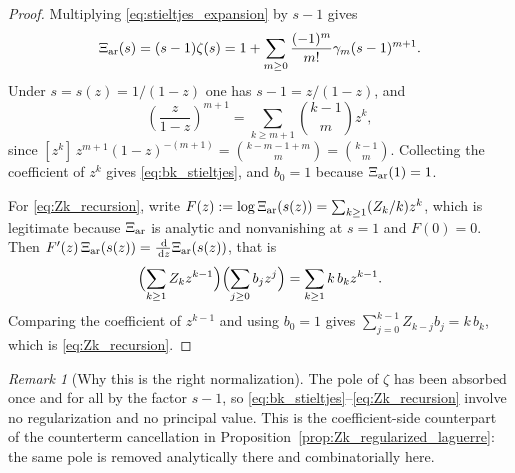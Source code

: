 \documentclass[11pt]{amsart}
\numberwithin{equation}{section}
\theoremstyle{plain}
\theoremstyle{definition}
\theoremstyle{remark}
\newtheorem{remark}[theorem]{Remark}
\newcommand{\dd}{\,\mathrm d}
\begin{document}
\begin{proof}
Multiplying \eqref{eq:stieltjes_expansion} by $s-1$ gives
\begin{equation}
 \Xi_{\rm ar}(s)=(s-1)\zeta(s)
 =1+\sum_{m\ge0}\frac{(-1)^m}{m!}\gamma_m(s-1)^{m+1}.
\end{equation}
Under $s=s(z)=1/(1-z)$ one has $s-1=z/(1-z)$, and
\begin{equation}
 \left(\frac{z}{1-z}\right)^{m+1}
 =\sum_{k\ge m+1}\binom{k-1}{m}z^k ,
\end{equation}
since $[z^k]\,z^{m+1}(1-z)^{-(m+1)}=\binom{k-m-1+m}{m}=\binom{k-1}{m}$.  Collecting the
coefficient of $z^k$ gives \eqref{eq:bk_stieltjes}, and $b_0=1$ because
$\Xi_{\rm ar}(1)=1$.

For \eqref{eq:Zk_recursion}, write $F(z):=\log\Xi_{\rm ar}(s(z))=\sum_{k\ge1}(Z_k/k)z^k$,
which is legitimate because $\Xi_{\rm ar}$ is analytic and nonvanishing at $s=1$ and
$F(0)=0$.  Then $F'(z)\,\Xi_{\rm ar}(s(z))=\frac{\dd}{\dd z}\Xi_{\rm ar}(s(z))$, that is
\begin{equation}
 \Bigl(\sum_{k\ge1}Z_kz^{k-1}\Bigr)\Bigl(\sum_{j\ge0}b_jz^j\Bigr)
 =\sum_{k\ge1}k\,b_kz^{k-1}.
\end{equation}
Comparing the coefficient of $z^{k-1}$ and using $b_0=1$ gives
$\sum_{j=0}^{k-1}Z_{k-j}b_j=k\,b_k$, which is \eqref{eq:Zk_recursion}.
\end{proof}

\begin{remark}[Why this is the right normalization]
\label{rem:no_pole_in_recursion}
The pole of $\zeta$ has been absorbed once and for all by the factor $s-1$, so
\eqref{eq:bk_stieltjes}--\eqref{eq:Zk_recursion} involve no regularization and no
principal value.  This is the coefficient-side counterpart of the counterterm
cancellation in Proposition~\ref{prop:Zk_regularized_laguerre}: the same pole is removed
analytically there and combinatorially here.
\end{remark}
\end{document}
